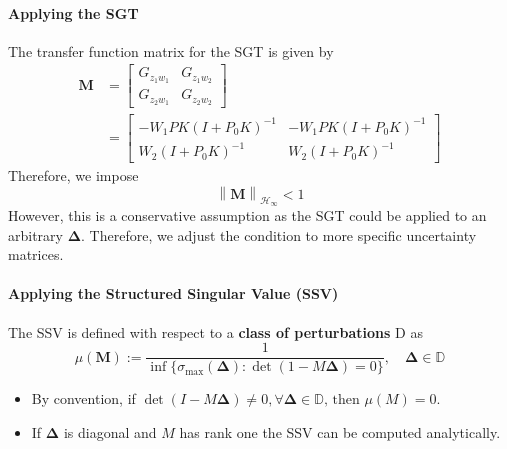 \paragraph{Applying the SGT}

The transfer function matrix for the SGT is given by
\begin{align*}
    \mathbf{M} & =
    \begin{bmatrix}
        G_{{z_{1}w_{1}}} & G_{{z_{1}w_{2}}} \\
        G_{{z_{2}w_{1}}} & G_{{z_{2}w_{2}}}
    \end{bmatrix}                     \\
               & =\begin{bmatrix}
                      -W_1PK(I+P_0K)^{-1} & -W_1PK(I+P_0K)^{-1} \\
                      W_2(I+P_0K)^{-1}    & W_2(I+P_0K)^{-1}
                  \end{bmatrix}
\end{align*}
Therefore, we impose
\begin{equation*}
    \left\|\mathbf{M}\right\|_{\mathcal{H}_\infty}<1
\end{equation*}
However, this is a conservative assumption as the SGT could be applied to an arbitrary $\boldsymbol{\Delta}$. Therefore, we adjust the condition to more specific uncertainty matrices.

\paragraph{Applying the Structured Singular Value (SSV)}


The SSV is defined with respect to a \textbf{class of perturbations} $\mathrm{D}$ as
\begin{equation*}
    \mu(\mathbf{M}):=\frac1{\inf\{\sigma_{\max}(\boldsymbol{\Delta}):\det(1-M\boldsymbol{\Delta})=0\}},\quad\boldsymbol{\Delta}\in\mathbb{D}
\end{equation*}
\begin{itemize}
    \item By convention, if $\det(I-M\boldsymbol{\Delta})\neq0,\forall\boldsymbol{\Delta}\in\mathbb{D}\text{, then }\mu(M)=0$.
    \item If $\boldsymbol{\Delta}$ is diagonal and $M$ has rank one the SSV can be computed analytically.
\end{itemize}

